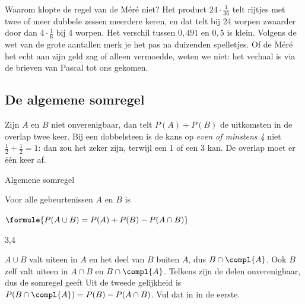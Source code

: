Waarom klopte de regel van de Méré niet? Het product $24 \cdot \frac{1}{36}$ telt rijtjes met twee of meer dubbele zessen meerdere keren, en dat telt bij 24 worpen zwaarder door dan $4 \cdot \frac16$ bij 4 worpen. Het verschil tussen $0{,}491$ en $0{,}5$ is klein. Volgens de wet van de grote aantallen merk je het pas na duizenden spelletjes. Of de Méré het echt aan zijn geld zag of alleen vermoedde, weten we niet: het verhaal is via de brieven van Pascal tot ons gekomen.

\subsection{De algemene somregel}

Zijn $A$ en $B$ niet onverenigbaar, dan telt $P(A) + P(B)$ de uitkomsten in de overlap twee keer. Bij een dobbelsteen is de kans op \textit{even of minstens 4} niet $\frac12 + \frac12 = 1$: dan zou het zeker zijn, terwijl een 1 of een 3 kan. De overlap moet er één keer af.

\begin{theorie}
\begin{stelling}{Algemene somregel}
\begin{minipage}[t]{.64\linewidth}
\vspace{0pt}
Voor alle gebeurtenissen $A$ en $B$ is

\vspace{1mm}
\qquad $\formule{P(A \cup B) = P(A) + P(B) - P(A \cap B)}$
\end{minipage}\hfill
\begin{minipage}[t]{.3\linewidth}
\vspace{0pt}
\end{minipage}
\end{stelling}

\begin{alleenvoor}{3,4}
\begin{bewijs}
$A \cup B$ valt uiteen in $A$ en het deel van $B$ buiten $A$, dus $B \cap \compl{A}$. Ook $B$ zelf valt uiteen in $A \cap B$ en $B \cap \compl{A}$. Telkens zijn de delen onverenigbaar, dus de somregel geeft
Uit de tweede gelijkheid is $P(B \cap \compl{A}) = P(B) - P(A \cap B)$. Vul dat in in de eerste.
\end{bewijs}
\end{alleenvoor}
\end{theorie}

